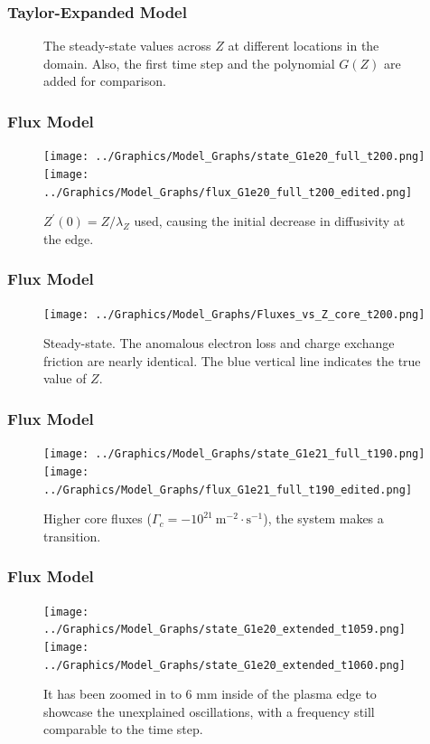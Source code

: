 \documentclass[10pt]{beamer}
\newcommand\TwoFigOneCap[4]{%
	\begin{figure}[hbt]
		\minipage[t]{0.48\textwidth}\centering
			{#1}
		\endminipage\hfill
		\minipage[t]{0.48\textwidth}\centering
			{#2}
		\endminipage
		\caption{#3}\label{#4}
	\end{figure}%
}
\begin{document}
\begin{frame} %
\frametitle{Taylor-Expanded Model}
\begin{figure}[h]
	\caption{The steady-state values across $Z$ at different locations in the domain.
	Also, the first time step and the polynomial $G(Z)$ are added for comparison.}
\end{figure}
\end{frame}


\begin{frame} %
\frametitle{Flux Model}
\TwoFigOneCap{\texttt{[image: ../Graphics/Model\_Graphs/state\_G1e20\_full\_t200.png]}}
	{\texttt{[image: ../Graphics/Model\_Graphs/flux\_G1e20\_full\_t200\_edited.png]}}
	{$Z^\prime(0) = Z / \lambda_Z$ used, causing the initial decrease in diffusivity at the edge.}
	{fig:flux_state_full}
\end{frame}


\begin{frame} %
\frametitle{Flux Model}
\begin{figure}[!b] %
	\centering
	\texttt{[image: ../Graphics/Model\_Graphs/Fluxes\_vs\_Z\_core\_t200.png]}
	\caption{Steady-state. The anomalous electron loss and charge exchange friction are nearly identical.
	The blue vertical line indicates the true value of $Z$.}
	\label{fig:fluxes_steady-state}
\end{figure}
\end{frame}


\begin{frame} %
\frametitle{Flux Model}
\TwoFigOneCap{\texttt{[image: ../Graphics/Model\_Graphs/state\_G1e21\_full\_t190.png]}}
	{\texttt{[image: ../Graphics/Model\_Graphs/flux\_G1e21\_full\_t190\_edited.png]}}
	{Higher core fluxes ($\Gamma_c = -10^{21}~\text{m}^{-2}\cdot\text{s}^{-1}$), the system makes a transition.}
	{fig:higher_core_flux}
\end{frame}


\begin{frame} %
\frametitle{Flux Model}

\TwoFigOneCap{\texttt{[image: ../Graphics/Model\_Graphs/state\_G1e20\_extended\_t1059.png]}}
	{\texttt{[image: ../Graphics/Model\_Graphs/state\_G1e20\_extended\_t1060.png]}}
	{It has been zoomed in to 6 mm inside of the plasma edge to showcase the unexplained oscillations, with a frequency still comparable to the time step.}
	{fig:oscillations_extended}

\end{frame}
\end{document}
